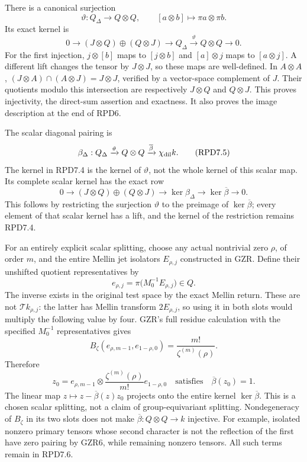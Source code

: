 There is a canonical surjection \[
\vartheta:Q_\Delta\to Q\otimes Q,
\qquad [a\otimes b]\mapsto\pi a\otimes\pi b.
\tag{RPD7.3}
\] Its exact kernel is \[
\boxed{
0\to(J\otimes Q)\oplus(Q\otimes J)
\longrightarrow Q_\Delta\xrightarrow{\vartheta}Q\otimes Q\to0.}
\tag{RPD7.4}
\] For the first injection, \(j\otimes[b]\) maps to \([j\otimes b]\) and
\([a]\otimes j\) maps to \([a\otimes j]\). A different lift changes the
tensor by \(J\otimes J\), so these maps are well-defined. In
\(A\otimes A\), \((J\otimes A)\cap(A\otimes J)=J\otimes J\), verified by
a vector-space complement of \(J\). Their quotients modulo this
intersection are respectively \(J\otimes Q\) and \(Q\otimes J\). This
proves injectivity, the direct-sum assertion and exactness. It also
proves the image description at the end of RPD6.

The scalar diagonal pairing is \[
\beta_\Delta:Q_\Delta\xrightarrow{\vartheta}Q\otimes Q
\xrightarrow{\overline\beta}\chi_{\rm dil}k.
\tag{RPD7.5}
\] The kernel in RPD7.4 is the kernel of \(\vartheta\), not the whole
kernel of this scalar map. Its complete scalar kernel has the exact row
\[
\boxed{
0\to(J\otimes Q)\oplus(Q\otimes J)
\to\ker\beta_\Delta\to\ker\overline\beta\to0.}
\tag{RPD7.6}
\] This follows by restricting the surjection \(\vartheta\) to the
preimage of \(\ker\overline\beta\); every element of that scalar kernel
has a lift, and the kernel of the restriction remains RPD7.4.

For an entirely explicit scalar splitting, choose any actual nontrivial
zero \(\rho\), of order \(m\), and the entire Mellin jet isolators
\(E_{\rho,j}\) constructed in GZR. Define their unshifted quotient
representatives by \[
e_{\rho,j}=\pi\bigl(M_0^{-1}E_{\rho,j}\bigr)\in Q.
\] The inverse exists in the original test space by the exact Mellin
return. These are not \(\mathcal T k_{\rho,j}\): the latter has Mellin
transform \(2E_{\rho,j}\), so using it in both slots would multiply the
following value by four. GZR's full residue calculation with the
specified \(M_0^{-1}\) representatives gives \[
B_\zeta(e_{\rho,m-1},e_{1-\rho,0})
=\frac{m!}{\zeta^{(m)}(\rho)}.
\] Therefore \[
z_0=e_{\rho,m-1}\otimes
\frac{\zeta^{(m)}(\rho)}{m!}e_{1-\rho,0}
\quad\text{satisfies}\quad\overline\beta(z_0)=1.
\tag{RPD7.7}
\] The linear map \(z\mapsto z-\overline\beta(z)z_0\) projects onto the
entire kernel \(\ker\overline\beta\). This is a chosen scalar splitting,
not a claim of group-equivariant splitting. Nondegeneracy of \(B_\zeta\)
in its two slots does not make \(\overline\beta:Q\otimes Q\to k\)
injective. For example, isolated nonzero primary tensors whose second
character is not the reflection of the first have zero pairing by GZR6,
while remaining nonzero tensors. All such terms remain in RPD7.6.

